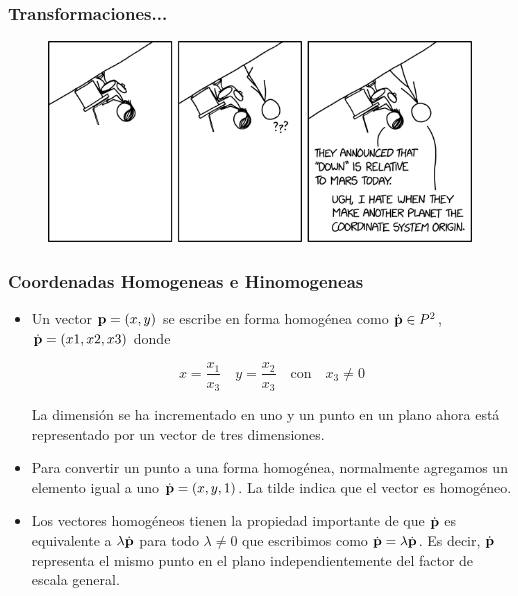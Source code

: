 \begin{frame}
    \frametitle{Transformaciones...}
    
    \begin{figure}[!h]
        \includegraphics[width=\columnwidth]{./images/joke_coordinate_systems.png}
    \end{figure}
    
\end{frame}

\begin{frame}
    \frametitle{Coordenadas Homogeneas e Hinomogeneas}
    
    \begin{itemize}
        \item Un vector $\boldsymbol{\mathbf{p}} = (x, y)$ se escribe en forma homogénea como $\dot{\boldsymbol{\mathbf{p}}} \in P^2$, $\dot{\boldsymbol{\mathbf{p}}} = (x1, x2, x3)$ donde
        
       \begin{equation*}
            x = \dfrac{x_1}{x_3} \quad y= \dfrac{x_2}{x_3} \quad \text{con} \quad x_3 \neq 0
       \end{equation*}
        
        La dimensión se ha incrementado en uno y un punto en un plano ahora está representado por un vector de tres dimensiones.
        \item Para convertir un punto a una forma homogénea, normalmente agregamos un elemento igual a uno $\dot{\boldsymbol{\mathbf{p}}} = (x, y, 1)$. La tilde indica que el vector es homogéneo.
        \item Los vectores homogéneos tienen la propiedad importante de que $\dot{\boldsymbol{\mathbf{p}}}$ es equivalente a $\lambda \dot{\boldsymbol{\mathbf{p}}}$ para todo $\lambda \neq 0$ que escribimos como $\dot{\boldsymbol{\mathbf{p}}} = \lambda \dot{\boldsymbol{\mathbf{p}}}$. Es decir, $\dot{\boldsymbol{\mathbf{p}}}$ representa el mismo punto en el plano independientemente del factor de escala general.
    \end{itemize}

    
\end{frame}



